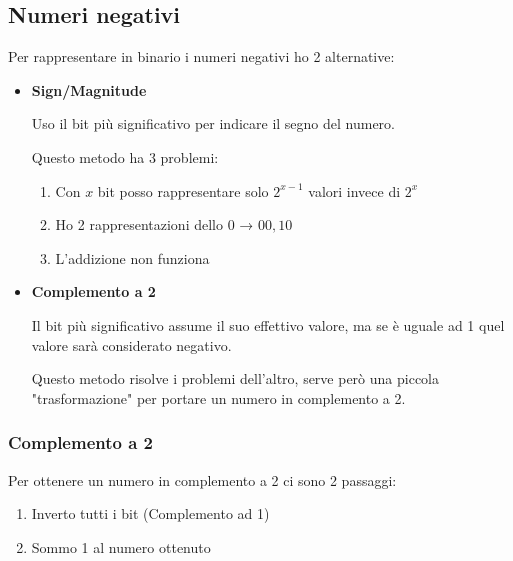 \documentclass{article}
\begin{document}
\subsection{Numeri negativi}

Per rappresentare in binario i numeri negativi ho 2 alternative:

\begin{itemize}
    \item \textbf{Sign/Magnitude}

        \vspace{2pt}

        Uso il bit più significativo per indicare il segno del numero.

        \vspace{3pt}
        
        Questo metodo ha 3 problemi:
        \begin{enumerate}
            \item Con $x$ bit posso rappresentare solo $2^{x-1}$ valori invece di $2^x$
            \item Ho 2 rappresentazioni dello 0 → $00,10$
            \item L'addizione non funziona
        \end{enumerate}

    \item \textbf{Complemento a 2}

        \vspace{2pt}

        Il bit più significativo assume il suo effettivo valore, ma se è uguale ad 1 quel valore sarà considerato negativo.

        \vspace{3pt}
            
        Questo metodo risolve i problemi dell'altro, serve però una piccola "trasformazione" per portare un numero in complemento a 2.

\end{itemize}

\subsubsection{Complemento a 2}

Per ottenere un numero in complemento a 2 ci sono 2 passaggi:
\begin{enumerate}
    \item Inverto tutti i bit (Complemento ad 1)

    \item Sommo 1 al numero ottenuto

\end{enumerate}
\end{document}
